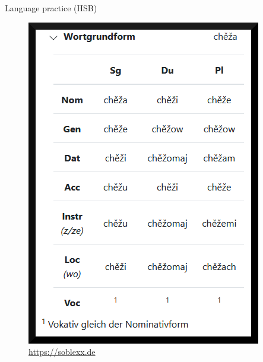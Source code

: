 \begin{block}{Language practice (HSB)}
    \begin{figure}
        \centering
        \includegraphics[width=0.5\colwidth]{05_z_02_soblex_klein_trunc_rand.png}
        \caption{\url{https://soblexx.de}}
        \label{fig:soblex}
    \end{figure}

    
  \end{block}
